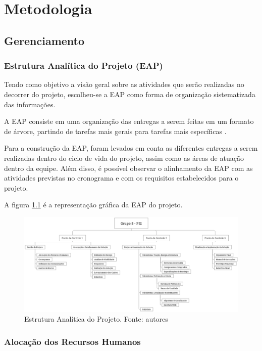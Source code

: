 \chapter{Metodologia}
  \section{Gerenciamento}
    \subsection{Estrutura Analítica do Projeto (EAP)}

      Tendo como objetivo a visão geral sobre as atividades que serão
      realizadas no decorrer do projeto, escolheu-se a EAP como forma
      de organização sistematizada das informações.

      A EAP consiste em uma organização das entregas
      a serem feitas em um formato de árvore, partindo de tarefas
      mais gerais para tarefas mais específicas \cite{pmbok2012}.

      Para a construção da EAP, foram levados em conta as diferentes
      entregas a serem realizadas dentro do ciclo de vida do projeto,
      assim como as áreas de atuação dentro da equipe. Além disso, é
      possível observar o alinhamento da EAP com as atividades previstas
      no cronograma e com os requisitos estabelecidos para o projeto.

      A figura \ref{fig:eap} é a representação gráfica da EAP do projeto.

      \begin{figure}[!htbp]
        \centering
        \includegraphics[width=\textwidth]{figuras/EAP.eps}
        \caption{Estrutura Analítica do Projeto. Fonte: autores}
        \label{fig:eap}
      \end{figure}

      \vfill
      \pagebreak

    \subsection{Alocação dos Recursos Humanos}

